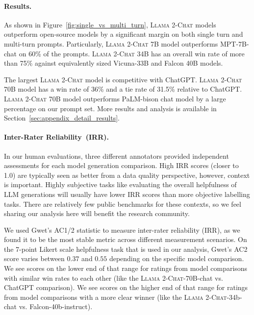 \paragraph{Results.}

As shown in Figure~\ref{fig:single_vs_multi_turn}, \textsc{Llama 2-Chat} models outperform open-source models by a significant margin on both single turn and multi-turn prompts. Particularly, \textsc{Llama 2-Chat} 7B model outperforms MPT-7B-chat on 60\% of the prompts. \textsc{Llama 2-Chat} 34B has an overall win rate of more than 75\% against equivalently sized Vicuna-33B and Falcon 40B models. 

The largest \textsc{Llama 2-Chat} model is competitive with ChatGPT. \textsc{Llama 2-Chat} 70B model has a win rate of 36\% and a tie rate of 31.5\% relative to ChatGPT. \textsc{Llama 2-Chat} 70B model outperforms PaLM-bison chat model by a large percentage on our prompt set. More results and analysis is available in Section~\ref{sec:appendix_detail_results}.

\paragraph{Inter-Rater Reliability~(IRR).} In our human evaluations, three different annotators provided independent assessments for each model generation comparison. High IRR scores (closer to 1.0) are typically seen as better from a data quality perspective, however, context is important. Highly subjective tasks like evaluating the overall helpfulness of LLM generations will usually have lower IRR scores than more objective labelling tasks. There are relatively few public benchmarks for these contexts, so we feel sharing our analysis here will benefit the research community.

We used Gwet's AC1/2 statistic \citep{gwet-2008-computing,gwet-2014-handbook} to measure inter-rater reliability (IRR), as we found it to be the most stable metric across different measurement scenarios. On the 7-point Likert scale helpfulness task that is used in our analysis, Gwet's AC2 score varies between $0.37$ and $0.55$ depending on the specific model comparison. We see scores on the lower end of that range for ratings from model comparisons with similar win rates to each other (like the \textsc{Llama 2-Chat}-70B-chat vs. ChatGPT comparison). We see scores on the higher end of that range for ratings from model comparisons with a more clear winner (like the \textsc{Llama 2-Chat}-34b-chat vs. Falcon-40b-instruct).

